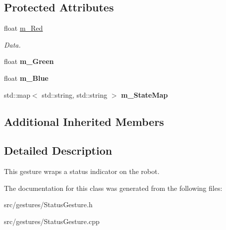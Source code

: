 \subsection*{Protected Attributes}
\begin{DoxyCompactItemize}
\item 
\mbox{\label{class_status_gesture_a8ac29241829de3bb86ae269668a3145f}} 
float \hyperlink{class_status_gesture_a8ac29241829de3bb86ae269668a3145f}{m\+\_\+\+Red}
\begin{DoxyCompactList}\small\item\em Data. \end{DoxyCompactList}\item 
\mbox{\label{class_status_gesture_a0405e60c8c4f9d633ef052acbb5ee99a}} 
float {\bfseries m\+\_\+\+Green}
\item 
\mbox{\label{class_status_gesture_a5cdfe986ef967fb8acff58658ef551c0}} 
float {\bfseries m\+\_\+\+Blue}
\item 
\mbox{\label{class_status_gesture_a49edc346230e6c51dc3784f9660e83d5}} 
std\+::map$<$ std\+::string, std\+::string $>$ {\bfseries m\+\_\+\+State\+Map}
\end{DoxyCompactItemize}
\subsection*{Additional Inherited Members}


\subsection{Detailed Description}
This gesture wraps a status indicator on the robot. 

The documentation for this class was generated from the following files\+:\begin{DoxyCompactItemize}
\item 
src/gestures/Status\+Gesture.\+h\item 
src/gestures/Status\+Gesture.\+cpp\end{DoxyCompactItemize}
